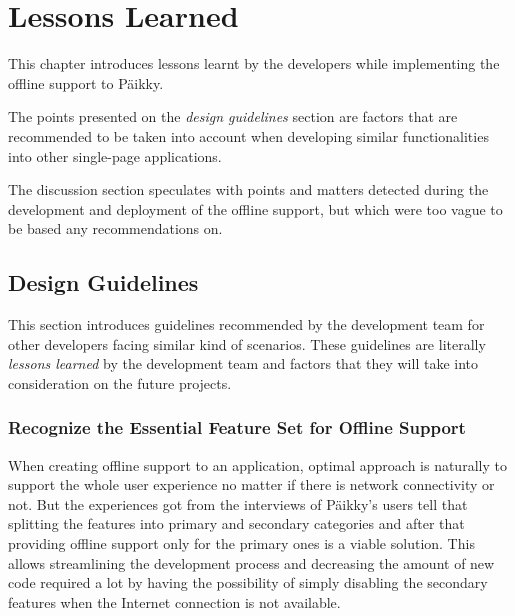 \chapter{Lessons Learned}

This chapter introduces lessons learnt by the developers while implementing the offline support to Päikky. 

The points presented on the \textit{design guidelines} section are factors that are recommended to be taken into account when developing similar functionalities into other single-page applications.

The discussion section speculates with points and matters detected during the development and deployment of the offline support, but which were too vague to be based any recommendations on. 




\section{Design Guidelines}

This section introduces guidelines recommended by the development team for other developers facing similar kind of scenarios. These guidelines are literally \textit{lessons learned} by the development team and factors that they will take into consideration on the future projects.



\subsection{Recognize the Essential Feature Set for Offline Support}

When creating offline support to an application, optimal approach is naturally to support the whole user experience no matter if there is network connectivity or not. But the experiences got from the interviews of Päikky's users tell that splitting the features into primary and secondary categories and after that providing offline support only for the primary ones is a viable solution. This allows streamlining the development process and decreasing the amount of new code required a lot by having the possibility of simply disabling the secondary features when the Internet connection is not available.

